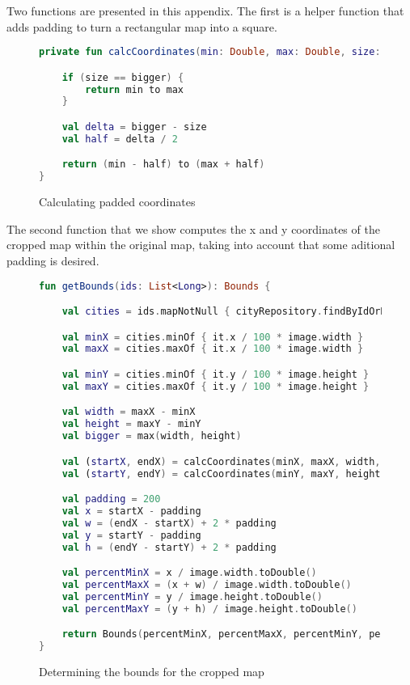 Two functions are presented in this appendix. The first is a helper function that adds padding to turn a rectangular map into a square.

\begin{figure}[hbt!]
	\begin{center}
		\begin{lstlisting}[language=Kotlin,label={lst:appendix-b-code-1}]
private fun calcCoordinates(min: Double, max: Double, size: Double, bigger: Double): Pair<Double, Double> {

	if (size == bigger) {
		return min to max
	}

	val delta = bigger - size
	val half = delta / 2

	return (min - half) to (max + half)
}
		\end{lstlisting}
	\end{center}
	\caption{Calculating padded coordinates}
	\label{fig:appendix-b-1}
\end{figure}

\clearpage
The second function that we show computes the x and y coordinates of the cropped map within the original map, taking into account that some aditional padding is desired.
\begin{figure}[hbt!]
    \begin{center}
        \begin{lstlisting}[language=Kotlin,label={lst:appendix-b-code-2}]
fun getBounds(ids: List<Long>): Bounds {

	val cities = ids.mapNotNull { cityRepository.findByIdOrNull(it) }

	val minX = cities.minOf { it.x / 100 * image.width }
	val maxX = cities.maxOf { it.x / 100 * image.width }

	val minY = cities.minOf { it.y / 100 * image.height }
	val maxY = cities.maxOf { it.y / 100 * image.height }

	val width = maxX - minX
	val height = maxY - minY
	val bigger = max(width, height)

	val (startX, endX) = calcCoordinates(minX, maxX, width, bigger)
	val (startY, endY) = calcCoordinates(minY, maxY, height, bigger)

	val padding = 200
	val x = startX - padding
	val w = (endX - startX) + 2 * padding
	val y = startY - padding
	val h = (endY - startY) + 2 * padding

	val percentMinX = x / image.width.toDouble()
	val percentMaxX = (x + w) / image.width.toDouble()
	val percentMinY = y / image.height.toDouble()
	val percentMaxY = (y + h) / image.height.toDouble()

	return Bounds(percentMinX, percentMaxX, percentMinY, percentMaxY)
}
        \end{lstlisting}
    \end{center}
    \caption{Determining the bounds for the cropped map}
    \label{fig:appendix-b-2}
\end{figure}
